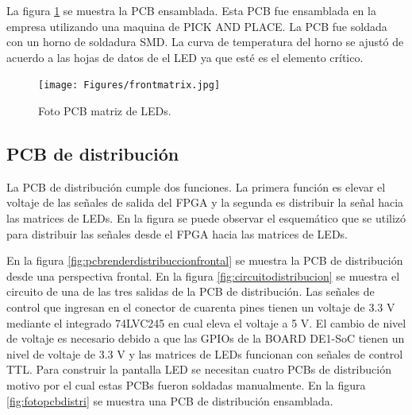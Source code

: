 La figura \ref{fig:fotomatrixled} se muestra la PCB ensamblada. Esta PCB fue ensamblada en la empresa utilizando una maquina de PICK AND PLACE. La PCB fue soldada con un horno de soldadura SMD. La curva de temperatura del horno se ajustó de acuerdo a las hojas de datos de el LED ya que esté es el elemento crítico.

\begin{figure}[htpb]
	\centering
    \texttt{[image: Figures/frontmatrix.jpg]} 
	\caption{Foto PCB matriz de LEDs.}
	\label{fig:fotomatrixled}
\end{figure}



\subsection{PCB de distribución}
La PCB de distribución cumple dos funciones. La primera función es elevar el voltaje de las señales de salida del FPGA y la segunda es distribuir la señal hacia las matrices de LEDs. En la figura se puede observar el esquemático que se utilizó para distribuir las señales desde el FPGA hacia las matrices de LEDs. 

En la figura \ref{fig:pcbrenderdistribuccionfrontal}  se muestra la PCB de distribución desde una perspectiva frontal. En la figura \ref{fig:circuitodistribucion} se muestra el circuito de una de las tres salidas de la PCB de distribución. Las señales de control que ingresan en el conector de cuarenta pines tienen un voltaje de 3.3 V mediante el integrado 74LVC245 en cual eleva el voltaje a 5 V. El cambio de nivel de voltaje es necesario debido a que las GPIOs de la BOARD DE1-SoC tienen un nivel de voltaje de 3.3 V y las matrices de LEDs funcionan con señales de control TTL. Para construir la pantalla LED se necesitan cuatro PCBs de distribución motivo por el cual estas PCBs fueron soldadas manualmente. En la figura \ref{fig:fotopcbdistri} se muestra una PCB de distribución ensamblada. 

